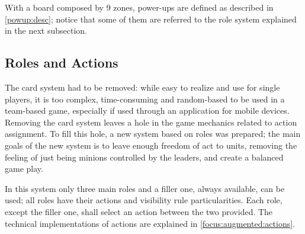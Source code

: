 			With a board composed by 9 zones, power-ups are defined as described in \autoref{powup:desc}; notice that some of them are referred to the role system explained in the next subsection.
		
		\subsection{Roles and Actions}
		
			The card system had to be removed: while easy to realize and use for single players, it is too complex, time-consuming and random-based to be used in a team-based game, especially if used through an application for mobile devices.
			Removing the card system leaves a hole in the game mechanics related to action assignment. To fill this hole, a new system based on roles was prepared; the main goals of the new system is to leave enough freedom of act to units, removing the feeling of just being minions controlled by the leaders, and create a balanced game play.
			
			In this system only three main roles and a filler one, always available, can be used; all roles have their actions and visibility rule particularities.
			Each role, except the filler one, shall select an action between the two provided.
			The technical implementations of actions are explained in \autoref{focus:augmented:actions}.
		
